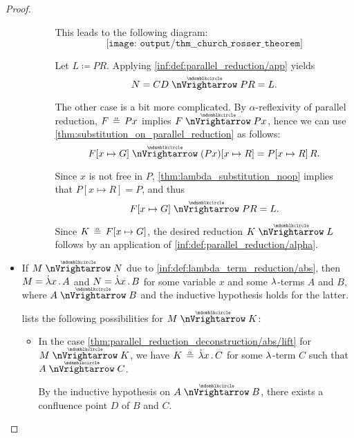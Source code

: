 \begin{proof}
\begin{itemize}
\begin{itemize}
\begin{itemize}
        This leads to the following diagram:
        \begin{equation*}
          \texttt{[image: output/thm\_\_church\_rosser\_theorem]}
        \end{equation*}

        Let \( L \coloneqq PR \). Applying \ref{inf:def:parallel_reduction/app} yields
        \begin{equation*}
          N = CD \ppred PR = L.
        \end{equation*}

        The other case is a bit more complicated. By \( \alpha \)-reflexivity of parallel reduction, \( F \aequiv Px \) implies \( F \ppred Px \), hence we can use \cref{thm:substitution_on_parallel_reduction} as follows:
        \begin{equation*}
          F[x \mapsto G] \ppred (Px)[x \mapsto R] = P[x \mapsto R] \thinspace R.
        \end{equation*}

        Since \( x \) is not free in \( P \), \cref{thm:lambda_substitution_noop} implies that \( P[x \mapsto R] = P \), and thus
        \begin{equation*}
          F[x \mapsto G] \ppred PR = L.
        \end{equation*}

        Since \( K \aequiv F[x \mapsto G] \), the desired reduction \( K \ppred L \) follows by an application of \ref{inf:def:parallel_reduction/alpha}.
      \end{itemize}
    \end{itemize}

    \item If \( M \ppred N \) due to \ref{inf:def:lambda_term_reduction/abs}, then \( M = \qabs x A \) and \( N = \qabs x B \) for some variable \( x \) and some \( {\mathrm \lambda} \)-terms \( A \) and \( B \), where \( A \ppred B \) and the inductive hypothesis holds for the latter.

     lists the following possibilities for \( M \ppred K \):
    \begin{itemize}
      \item In the case \cref{thm:parallel_reduction_deconstruction/abs/lift} for \( M \ppred K \), we have \( K \aequiv \qabs x C \) for some \( {\mathrm \lambda} \)-term \( C \) such that \( A \ppred C \).

      By the inductive hypothesis on \( A \ppred B \), there exists a confluence point \( D \) of \( B \) and \( C \).


\end{itemize}
\end{itemize}
\end{proof}
